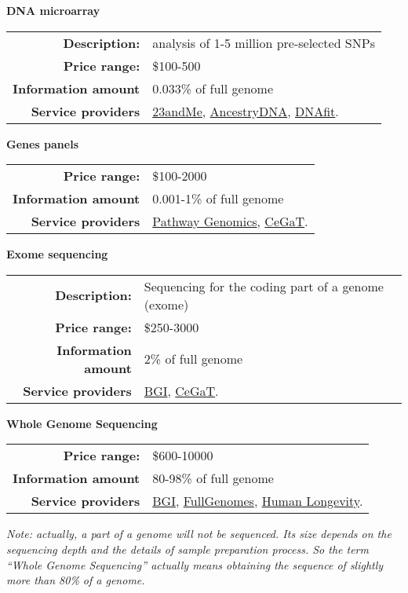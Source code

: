 
\textbf{DNA microarray} \newline
\begin{tabular}{r|p{11cm}} \hline
    \small\textbf{Description:} &
        \small analysis of 1-5 million pre-selected SNPs \\
    \small\textbf{Price range:}         & \small \$100-500 \\
    \small\textbf{Information amount}   & \small 0.033\% of full genome \\
    \small\textbf{Service providers}    & \small
     \href{https://www.23andme.com/}{23andMe},
     \href{https://www.ancestry.com/dna/}{AncestryDNA},
     \href{https://www.dnafit.com/}{DNAfit}.\\
\end{tabular}
\vskip0.2cm

\textbf{Genes panels} \newline
\begin{tabular}{r|p{11cm}} \hline
    \small\textbf{Price range:}         & \small \$100-2000 \\
    \small\textbf{Information amount}   & \small 0.001-1\% of full genome \\
    \small\textbf{Service providers}    & \small
     \href{https://www.pathway.com/}{Pathway Genomics},
     \href{http://www.cegat.de/en/}{CeGaT}.\\
\end{tabular}
\vskip0.2cm


\textbf{Exome sequencing} \newline
\begin{tabular}{r|p{11cm}} \hline
    \small\textbf{Description:} &
      \small Sequencing for the coding part of a genome (exome) \\
    \small\textbf{Price range:}         & \small \$250-3000 \\
    \small\textbf{Information amount}   & \small 2\% of full genome \\
    \small\textbf{Service providers}    & \small
     \href{https://www.bgi.com}{BGI},
     \href{http://www.cegat.de/en/}{CeGaT}.\\
\end{tabular}
\vskip0.2cm


\textbf{Whole Genome Sequencing} \newline
\begin{tabular}{r|p{11cm}} \hline
    \small\textbf{Price range:}         & \small \$600-10000 \\
    \small\textbf{Information amount}   & \small 80-98\% of full genome \\
    \small\textbf{Service providers}    & \small
     \href{https://www.bgi.com}{BGI},
     \href{https://www.fullgenomes.com/}{FullGenomes},
     \href{http://www.humanlongevity.com/}{Human Longevity}.\\
\end{tabular}
\vskip0.2cm

\parbox{\textwidth}{\it\small Note: actually, a part of a genome will not be sequenced. Its size depends on the sequencing depth and the details of sample preparation process. So the term “Whole Genome Sequencing” actually means obtaining the sequence of slightly more than 80\% of a genome.}
